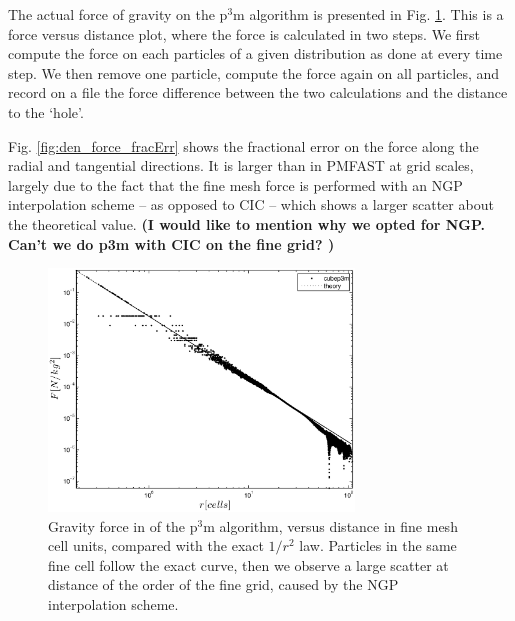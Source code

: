 The actual force of gravity on the p$^3$m algorithm is presented in Fig. \ref{fig:den_force_ppext0}.
This is a force versus distance plot, where the force is calculated in two steps. 
We first compute the force on each particles of a given distribution as done at every time step.
We then remove one particle, compute the force again on all particles, and record on a file the 
force difference between the two calculations and the distance to the `hole'.

Fig. \ref{fig:den_force_fracErr} shows the fractional error on the force along the radial and tangential directions.
It is larger than in {\small PMFAST} at grid scales, largely due to the fact that the fine mesh force is performed with an NGP interpolation scheme -- as opposed to CIC -- which shows a larger scatter about the theoretical value. {\bf (I would like to mention why we opted for NGP. Can't we do p3m with CIC on the fine grid? )}


\begin{figure}%
  \begin{center}
    \includegraphics[width=3.2in]{graphs/densityForce_ppext=0.eps}
  \caption{Gravity force in of the p$^3$m algorithm, versus distance in fine mesh cell units, compared with the exact $1/r^{2}$ law.
  Particles in the same fine cell follow the exact curve, then we observe a large scatter at 
  distance of the order of the fine grid, caused by the NGP interpolation scheme. 
    \label{fig:den_force_ppext0}}
\end{center}
\end{figure}

